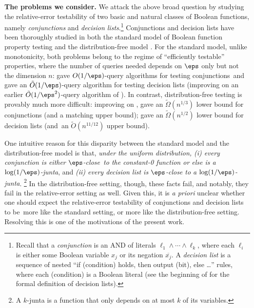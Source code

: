 \documentclass[11pt]{article}
\theoremstyle{definition}
\begin{document}
\noindent
{\bf The problems we consider.} We attack the above broad question by   studying the relative-error testability of two basic and natural classes of Boolean functions, namely \emph{conjunctions} and \emph{decision lists}.\footnote{Recall that a \emph{conjunction} is an AND of literals $\ell_1 \wedge \cdots \wedge \ell_k$, where each $\ell_i$ is either some Boolean variable $x_j$ or its negation $\overline{x_j}$.
A \emph{decision list} is a sequence of nested ``if (condition) holds, then output (bit), else \dots'' rules, where each (condition) is a Boolean literal (see the beginning of  for the formal definition of decision lists).} 
Conjunctions and decision lists have been thoroughly studied in both the standard model of Boolean function property testing and the distribution-free model \cite{PRS02,DLM+:07,GlasnerServedio:09toc,CX16,GoldreichRon20,Bshouty20,CFP24}. For the standard model, unlike monotonicity, both problems belong to the regime of ``efficiently testable'' properties, where the number of queries needed depends on $\eps$ only but not the dimension $n$: 
\cite{PRS02,GoldreichRon20} gave $O(1/\eps)$-query algorithms for testing conjunctions~and \cite{Bshouty20} gave an $\tilde{O}(1/\eps)$-query algorithm for testing decision lists (improving on an earlier $\tilde{O}(1/\eps^2)$-query algorithm of \cite{DLM+:07}). In contrast,  distribution-free testing is provably much more difficult: improving on \cite{GlasnerServedio:09toc}, \cite{CX16} gave  an $\tilde{\Omega}(n^{1/3})$ lower bound for conjunctions (and a  matching upper bound);  \cite{CFP24} gave an $\tilde{\Omega}(n^{1/2})$ lower bound for decision lists (and~an $\tilde{O}(n^{11/12})$ upper bound).  

One intuitive reason for this disparity between the standard model and the distribution-free model is that, \emph{under the uniform distribution, (i) every conjunction is either $\eps$-close~to the constant-0 function or else is a $\log(1/\eps)$-junta}, and 
\emph{(ii) every decision list is $\eps$-close to a $\log(1/\eps)$-junta}.
\footnote{A $k$-junta is a function that only depends on at most $k$ of its variables.}  
In the distribution-free setting, though, these facts fail, and notably, they fail in the relative-error setting as well. Given this, it is \emph{a priori} unclear whether one should expect the relative-error testability of conjunctions and decision lists to be~more like the standard setting, or more like the distribution-free setting. {Resolving this is one of the motivations of the present work.}
\end{document}
